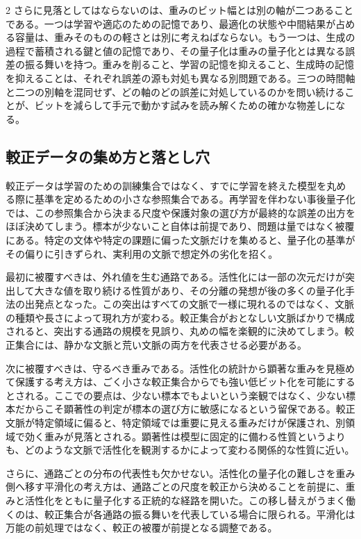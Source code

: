 \documentclass[lualatex,a4paper,10pt]{jlreq}
\begin{document}
\begin{multicols}{2}
さらに見落としてはならないのは、重みのビット幅とは別の軸が二つあることである。一つは学習や適応のための記憶であり、最適化の状態や中間結果が占める容量は、重みそのものの軽さとは別に考えねばならない。もう一つは、生成の過程で蓄積される鍵と値の記憶であり、その量子化は重みの量子化とは異なる誤差の振る舞いを持つ。重みを削ること、学習の記憶を抑えること、生成時の記憶を抑えることは、それぞれ誤差の源も対処も異なる別問題である。三つの時間軸と二つの別軸を混同せず、どの軸のどの誤差に対処しているのかを問い続けることが、ビットを減らして手元で動かす試みを読み解くための確かな物差しになる。

\subsection{較正データの集め方と落とし穴}
較正データは学習のための訓練集合ではなく、すでに学習を終えた模型を丸める際に基準を定めるための小さな参照集合である。再学習を伴わない事後量子化では、この参照集合から決まる尺度や保護対象の選び方が最終的な誤差の出方をほぼ決めてしまう。標本が少ないこと自体は前提であり、問題は量ではなく被覆にある。特定の文体や特定の課題に偏った文脈だけを集めると、量子化の基準がその偏りに引きずられ、実利用の文脈で想定外の劣化を招く。

最初に被覆すべきは、外れ値を生む通路である。活性化には一部の次元だけが突出して大きな値を取り続ける性質があり、その分離の発想が後の多くの量子化手法の出発点となった\autocite{llmint8}。この突出はすべての文脈で一様に現れるのではなく、文脈の種類や長さによって現れ方が変わる。較正集合がおとなしい文脈ばかりで構成されると、突出する通路の規模を見誤り、丸めの幅を楽観的に決めてしまう。較正集合には、静かな文脈と荒い文脈の両方を代表させる必要がある。

次に被覆すべきは、守るべき重みである。活性化の統計から顕著な重みを見極めて保護する考え方は、ごく小さな較正集合からでも強い低ビット化を可能にするとされる\autocite{awq}。ここでの要点は、少ない標本でもよいという楽観ではなく、少ない標本だからこそ顕著性の判定が標本の選び方に敏感になるという留保である。較正文脈が特定領域に偏ると、特定領域では重要に見える重みだけが保護され、別領域で効く重みが見落とされる。顕著性は模型に固定的に備わる性質というよりも、どのような文脈で活性化を観測するかによって変わる関係的な性質に近い。

さらに、通路ごとの分布の代表性も欠かせない。活性化の量子化の難しさを重み側へ移す平滑化の考え方は、通路ごとの尺度を較正から決めることを前提に、重みと活性化をともに量子化する正統的な経路を開いた\autocite{smoothquant}。この移し替えがうまく働くのは、較正集合が各通路の振る舞いを代表している場合に限られる。平滑化は万能の前処理ではなく、較正の被覆が前提となる調整である。


\end{multicols}
\end{document}
